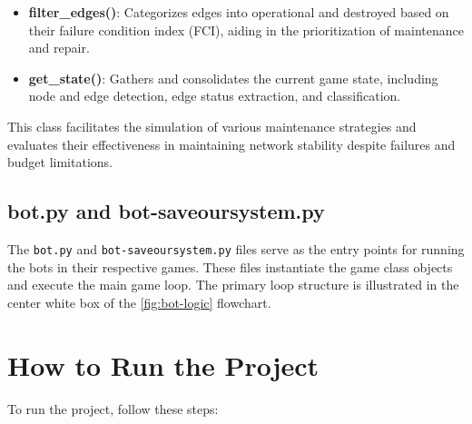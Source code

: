 \documentclass[12pt,a4paper]{report}
\begin{document}
\begin{itemize}
            \item \textbf{filter\_edges()}: Categorizes edges into operational and destroyed based on their failure condition index (FCI), aiding in the prioritization of maintenance and repair.
            
            \item \textbf{get\_state()}: Gathers and consolidates the current game state, including node and edge detection, edge status extraction, and classification.
        \end{itemize}

        This class facilitates the simulation of various maintenance strategies and evaluates their effectiveness in maintaining network stability despite failures and budget limitations.
    
    \section*{bot.py and bot-saveoursystem.py}
    \label{subsec:bot-files}
        
        The \texttt{bot.py} and \texttt{bot-saveoursystem.py} files serve as the entry points for running the bots in their respective games. These files instantiate the game class objects and execute the main game loop. The primary loop structure is illustrated in the center white box of the \cref{fig:bot-logic} flowchart.
    
    \chapter{How to Run the Project}
    \label{sec:how-to-run}
    
        To run the project, follow these steps:
        
\end{document}
